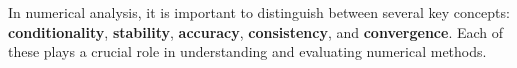 
In numerical analysis, it is important to distinguish between several key concepts: \textbf{conditionality}, \textbf{stability}, \textbf{accuracy}, \textbf{consistency}, and \textbf{convergence}. Each of these plays a crucial role in understanding and evaluating numerical methods.


